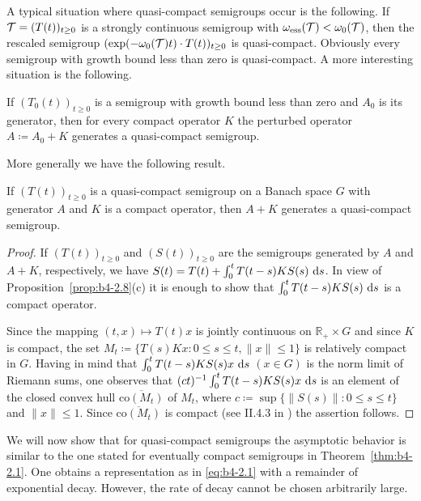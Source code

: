 A typical situation where quasi-compact semigroups occur is the following. 
If $\mathcal{T} = (T(t))_{t \geq 0}$ is a strongly continuous semigroup with $\omega_{\text{ess}}(\mathcal{T}) < \omega_{0}(\mathcal{T})$, then the rescaled semigroup $(\text{exp}(-\omega_{0}(\mathcal{T})t)\cdot T(t))_{t \geq 0}$ is quasi-compact. 
Obviously every semigroup with growth bound less than zero is quasi-compact. 
A more interesting situation is the following.

If $(T_{0}(t))_{t \geq 0}$ is a semigroup with growth bound less than zero and $A_{0}$ is its generator, then for every compact operator $K$ the perturbed operator $A \coloneqq A_{0} + K$ generates a quasi-compact semigroup.
	
More generally we have the following result.
\begin{proposition}\label{prop:b4-2.9}
    If $(T(t))_{t \geq 0}$ is a quasi-compact semigroup on a Banach space $G$ with generator $A$ and $K$ is a compact operator, then $A + K$ generates a quasi-compact semigroup.
\end{proposition}
\begin{proof}
	If $(T(t))_{t \geq 0}$ and $(S(t))_{t \geq 0}$ are the semigroups generated by $A$ and $A + K$, respectively, we have $S(t) = T(t) + \int_0^t T(t-s)KS(s) \,\mathop{}\!\mathrm{d}{s}$.
	In view of Proposition~\ref{prop:b4-2.8}(c) it is enough to show that $\int_0^t T(t-s)KS(s) \,\mathop{}\!\mathrm{d}{s}$ is a compact operator.
	
	Since the mapping $(t,x) \mapsto T(t)x$ is jointly continuous on $\mathbb{R}_+ \times G$ and since $K$ is compact, the set $M_t \coloneq \{T(s)Kx \colon 0 \leq s \leq t, \|x\| \leq 1\}$ is relatively compact in $G$. Having in mind that $\int_0^t T(t-s)KS(s)x \,\mathop{}\!\mathrm{d}{s}$ $(x \in G)$ is the norm limit of Riemann sums, one observes that 
	$(ct)^{-1}\int_0^t T(t-s)KS(s)x \,\mathop{}\!\mathrm{d}{s}$ is an element of the closed convex hull
	 $\overline{\mathrm{co}(M_t)}$ of $M_t$, where $c \coloneq \sup \{\|S(s)\| \colon 0 \leq s \leq t\}$ and $\|x\| \leq 1$. Since $\overline{\mathrm{co}(M_t)}$ is compact (see II.4.3 in \citet{schaefer:1966}) the assertion follows.
\end{proof}
We will now show that for quasi-compact semigroups the asymptotic behavior is similar to the one stated for eventually compact semigroups in Theorem~\ref{thm:b4-2.1}. 
One obtains a representation as in \eqref{eq:b4-2.1} with a remainder of exponential decay. 
However, the rate of decay cannot be chosen arbitrarily large.
